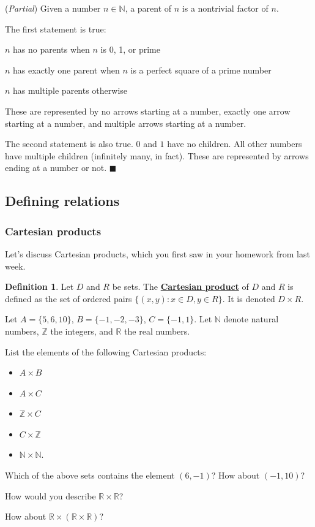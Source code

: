 \documentclass[11pt]{article}
\newenvironment{task}
	{\begin{mdframed}[linecolor=lightgray, linewidth=3pt]\raggedright}
	{\end{mdframed}}
\newcommand{\R}{\mathbb{R}}
\newcommand{\N}{\mathbb{N}}
\newcommand{\Z}{\mathbb{Z}}
\newcommand\st{:}
\renewcommand\emph[1]{\underline{\bf{#1}}} %
\theoremstyle{definition}
\newtheorem{definition}[theorem]{Definition}
\newenvironment{solution}{{\it Solution.} }{\hfill {\color{lightgray}$\blacksquare$}}
\begin{document}
\begin{solution}({\it Partial})
Given a number $n\in \N$, a parent of $n$ is a nontrivial factor of $n$.

The first statement is true: 

\vspace*{-8pt}
\begin{itemize*}
	\item $n$ has no parents when $n$ is 0, 1, or prime \\ 
	\item $n$ has exactly one parent when $n$ is a perfect square of a prime number \\
	\item $n$ has multiple parents otherwise
\end{itemize*}
\vspace*{-8pt}
These are represented by no arrows starting at a number, exactly one arrow starting at a number, and multiple arrows starting at a number.

The second statement is also true. $0$ and $1$ have no children. All other numbers have multiple children (infinitely many, in fact). These are represented by arrows ending at a number or not.
\end{solution}


\subsection{Defining relations}
\subsubsection{Cartesian products}
Let's discuss Cartesian products, which you first saw in your homework from last week.

\begin{definition}\label{d: cartesian product}
Let $D$ and $R$ be sets. The \emph{Cartesian product} of $D$ and $R$ is defined as the set of ordered pairs $\{ (x,y) \st x\in D, y\in R\}$. It is denoted $D\times R$.
\end{definition}

\begin{task}
Let $A=\{5, 6, 10\}$, $B=\{-1, -2, -3\}$, $C=\{-1,1\}$. Let $\N$ denote natural numbers, $\Z$ the integers,  and $\R$ the real numbers.

List the elements of the following Cartesian products:
	\begin{itemize}
	\item $A\times B$ 
	\item $A\times C$
	\item $\Z \times C$
	\item $C\times \Z$
	\item $\N \times \N$.
	\end{itemize}

Which of the above sets contains the element $(6, -1)$? How about $(-1, 10)$?

How would you describe $\R\times \R$? 

How about $\R\times (\R\times \R)$?
\end{task}
\end{document}
